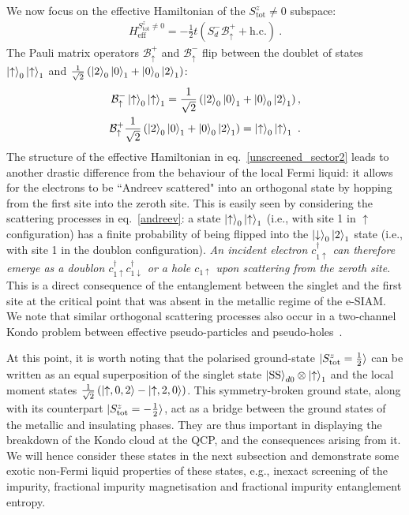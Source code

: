 We now focus on the effective Hamiltonian of the \(S^z_\text{tot} \neq 0\) subspace:
\begin{eqnarray}
	 H_\text{eff}^{S^z_\text{tot}\neq 0} = -\frac{1}{2}t\left(S_d^- \mathcal{B}^+_\uparrow + \text{h.c.}\right) \label{unscreened_sector2}~.
\end{eqnarray}
The Pauli matrix operators \(\mathcal{B}^+_\uparrow\) and \(\mathcal{B}^-_\uparrow\) flip between the doublet of states \(\ket{\uparrow}_0\ket{\uparrow}_1\) and \(\frac{1}{\sqrt 2}\left( \ket{2}_0\ket{0}_1 + \ket{0}_0\ket{2}_1 \right) \):
\begin{eqnarray}\label{andreev}
	\mathcal{B}^-_\uparrow\ket{\uparrow}_0\ket{\uparrow}_1 = \frac{1}{\sqrt 2}\left( \ket{2}_0\ket{0}_1 + \ket{0}_0\ket{2}_1 \right),\nonumber \\
	\mathcal{B}^+_\uparrow\frac{1}{\sqrt 2}\left( \ket{2}_0\ket{0}_1 + \ket{0}_0\ket{2}_1 \right) = \ket{\uparrow}_0\ket{\uparrow}_1~.
\end{eqnarray}
The structure of the effective Hamiltonian in eq.~\eqref{unscreened_sector2} leads to another drastic difference from the behaviour of the local Fermi liquid: it allows for the electrons to be ``Andreev scattered" into an orthogonal state by hopping from the first site into the zeroth site. This is easily seen by considering the scattering processes in eq.~\eqref{andreev}: a state \(\ket{\uparrow}_0\ket{\uparrow}_1\) (i.e., with site 1 in $\uparrow$ configuration) has a finite probability of being flipped into the \(\ket{\downarrow}_0\ket{2}_1\) state (i.e., with site 1 in the doublon configuration). {\it An incident electron \(c^\dagger_{1 \uparrow}\) can therefore emerge as a doublon \(c^\dagger_{1 \uparrow}c^\dagger_{1 \downarrow}\) or a hole \(c_{1 \uparrow}\) upon scattering from the zeroth site}. This is a direct consequence of the entanglement between the singlet and the first site at the critical point that was absent in the metallic regime of the e-SIAM. We note that similar orthogonal scattering processes also occur in a two-channel Kondo problem between effective pseudo-particles and pseudo-holes~\cite{von_delft_1998}.

At this point, it is worth noting that the polarised ground-state \(\ket{S_\text{tot}^z=\frac{1}{2}}\) can be written as an equal superposition of the singlet state \(\ket{\text{SS}}_{d0}\otimes\ket{\uparrow}_1\) and the local moment states \(\frac{1}{\sqrt 2}\left(\ket{\uparrow, 0, 2} - \ket{\uparrow, 2, 0}\right)\). This symmetry-broken ground state, along with its counterpart $\ket{S_\text{tot}^z=-\frac{1}{2}}$, act as a bridge between the ground states of the metallic and insulating phases. They are thus important in displaying the breakdown of the Kondo cloud at the QCP, and the consequences arising from it. We will hence consider these states in the next subsection and demonstrate some exotic non-Fermi liquid properties of these states, e.g., inexact screening of the impurity, fractional impurity magnetisation and fractional impurity entanglement entropy.

